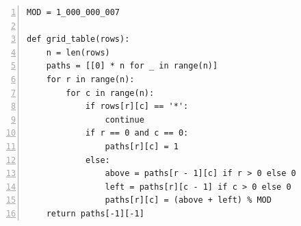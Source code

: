 \documentclass[aspectratio=169]{beamer}
\begin{document}
\begin{frame}
\begin{lrbox}{\codebox}\begin{minipage}{611pt}
\begin{lstlisting}[basicstyle=\ttfamily\fontsize{17.5}{19.6}\selectfont\color{ink},numbers=left,numberstyle=\ttfamily\fontsize{11.4}{19.6}\selectfont\color{quiet},numbersep=12pt,xleftmargin=28pt,firstnumber=1,breaklines=false,aboveskip=0pt,belowskip=0pt]
MOD = 1_000_000_007

def grid_table(rows):
    n = len(rows)
    paths = [[0] * n for _ in range(n)]
    for r in range(n):
        for c in range(n):
            if rows[r][c] == '*':
                continue
            if r == 0 and c == 0:
                paths[r][c] = 1
            else:
                above = paths[r - 1][c] if r > 0 else 0
                left = paths[r][c - 1] if c > 0 else 0
                paths[r][c] = (above + left) % MOD
    return paths[-1][-1]
\end{lstlisting}
\end{minipage}\end{lrbox}

\end{frame}
\end{document}

